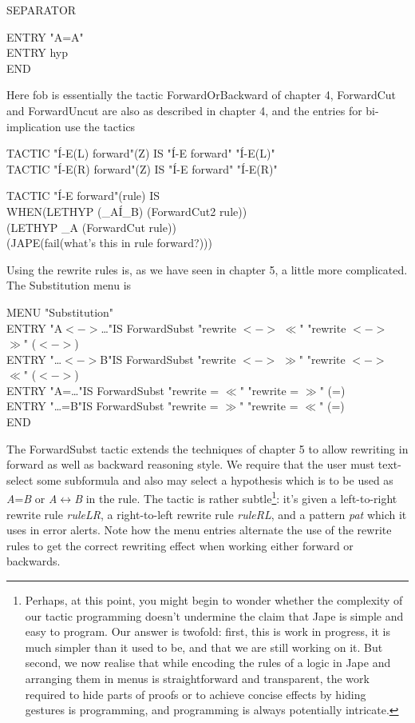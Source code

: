\documentclass[11pt]{book}
\newcommand{\tab}{\hspace{5mm}}
\begin{document}
\tab SEPARATOR

\tab ENTRY "A=A"\\
\tab ENTRY hyp\\
END


Here fob is essentially the tactic ForwardOrBackward of chapter 4, ForwardCut and ForwardUncut are also as described in chapter 4, and the entries for bi-implication use the tactics

TACTIC "\'{I}-E(L) forward"(Z) IS "\'{I}-E forward" "\'{I}-E(L)"\\
TACTIC "\'{I}-E(R) forward"(Z) IS "\'{I}-E forward" "\'{I}-E(R)"

TACTIC "\'{I}-E forward"(rule) IS\\
\tab WHEN\tab (LETHYP (\_A\'{I}\_B) (ForwardCut2 rule))\\
\tab \tab (LETHYP \_A (ForwardCut rule))\\
\tab \tab (JAPE(fail(what's this in rule forward?)))


Using the rewrite rules is, as we have seen in chapter 5, a little more complicated. The Substitution menu is

MENU "Substitution"\\
\tab ENTRY "A$<->$\dots "\tab IS ForwardSubst "rewrite $<->$ $\ll$" "rewrite $<->$ $\gg$" ($<->$)\\
\tab ENTRY "\dots $<->$B"\tab IS ForwardSubst "rewrite $<->$ $\gg$" "rewrite $<->$ $\ll$" ($<->$)\\
\tab ENTRY "A=\dots "\tab IS ForwardSubst "rewrite = $\ll$" "rewrite = $\gg$" (=)\\
\tab ENTRY "\dots =B"\tab IS ForwardSubst "rewrite = $\gg$" "rewrite = $\ll$" (=)\\
END


The ForwardSubst tactic extends the techniques of chapter 5 to allow rewriting in forward as well as backward reasoning style. We require that the user must text-select some subformula and also may select a hypothesis which is to be used as \textit{A}=\textit{B} or \textit{A}\ensuremath{\leftrightarrow}\textit{B} in the rule. The tactic is rather subtle\footnote{Perhaps, at this point, you might begin to wonder whether the complexity of our tactic programming doesn't undermine the claim that Jape is simple and easy to program. Our answer is twofold: first, this is work in progress, it is much simpler than it used to be, and that we are still working on it. But second, we now realise that while encoding the rules of a logic in Jape and arranging them in menus is straightforward and transparent, the work required to hide parts of proofs or to achieve concise effects by hiding gestures is programming, and programming is always potentially intricate.}: it's given a left-to-right rewrite rule \textit{ruleLR}, a right-to-left rewrite rule \textit{ruleRL}, and a pattern \textit{pat} which it uses in error alerts. Note how the menu entries alternate the use of the rewrite rules to get the correct rewriting effect when working either forward or backwards.
\end{document}
